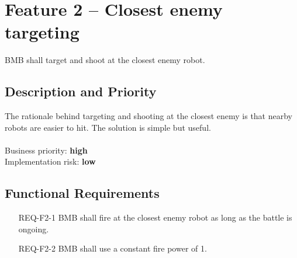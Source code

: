 \documentclass{scrreprt}
\begin{document}
\section{Feature 2 -- Closest enemy targeting}
BMB shall target and shoot at the closest enemy robot.

\subsection{Description and Priority}
The rationale behind targeting and shooting at the closest enemy is that nearby robots are easier to hit. The solution is simple but useful.\\\\Business priority: \textbf{high}\\
Implementation risk: \textbf{low}

\subsection{Functional Requirements}
\begin{itemize}
\item[REQ-F2-1] BMB shall fire at the closest enemy robot as long as the battle is ongoing.
\item[REQ-F2-2] BMB shall use a constant fire power of 1.
\end{itemize}


\end{document}

